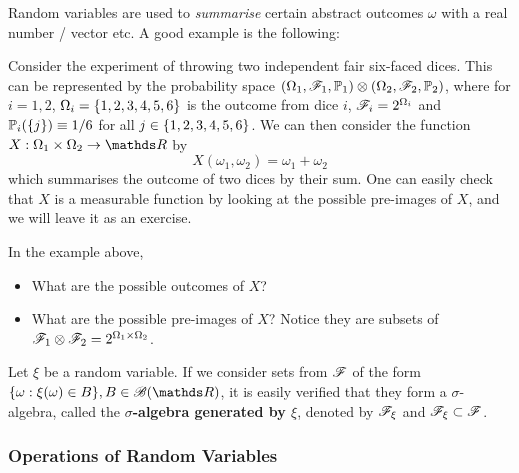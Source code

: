Random variables are used to \textit{summarise} certain abstract outcomes $\omega$ with a real number / vector etc. A good example is the following:

\begin{example} Consider the experiment of throwing two independent fair six-faced dices. This can be represented by the probability space $(\Omega_1, \mathcal{F}_1, \mathbb{P}_1) \otimes (\Omega_2, \mathcal{F}_2, \mathbb{P}_2)$, where for $i=1,2$, $\Omega_i = \left\{ 1,2,3,4,5,6 \right \}$ is the outcome from dice $i$, $\mathcal{F}_i = 2^{\Omega_i}$ and $\mathbb{P}_i(\left\{ j \right \}) \equiv 1/6$ for all $j \in \left\{ 1,2,3,4,5,6 \right \}$. We can then consider the function $X: \Omega_1 \times \Omega_2 \to \R$ by $$X(\omega_1, \omega_2) = \omega_1 + \omega_2$$
which summarises the outcome of two dices by their sum. One can easily check that $X$ is a measurable function by looking at the possible pre-images of $X$, and we will leave it as an exercise.
\end{example}

\begin{exercise}
In the example above,
\begin{itemize}
    \item What are the possible outcomes of $X$?
    \item What are the possible pre-images of $X$? Notice they are subsets of $\mathcal{F}_1 \otimes \mathcal{F}_2 = 2^{\Omega_1 \times \Omega_2}$.
\end{itemize}
\end{exercise}

\begin{remark}
Let $\xi$ be a random variable. If we consider sets from $\mathcal{F}$ of the form $\{ \omega: \xi(\omega) \in B \}, B \in \B(\R)$, it is easily verified that they form a $\sigma$-algebra, called the \textbf{$\sigma$-algebra generated by $\xi$}, denoted by $\mathcal{F}_\xi$ and $\mathcal{F}_\xi \subset \mathcal{F}$. 
\end{remark}

\subsubsection{Operations of Random Variables}

